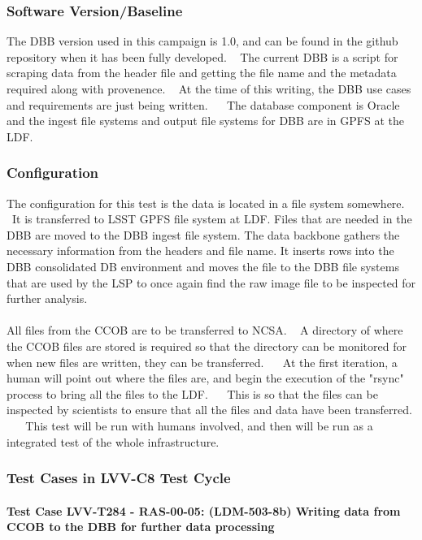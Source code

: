 \documentclass[DM,lsstdraft,STR,toc]{lsstdoc}
\begin{document}
  \subsubsection{Software Version/Baseline}
    The DBB version used in this campaign is 1.0, and can be found in the
github repository when it has been fully developed. ~ The current DBB is
a script for scraping data from the header file and getting the file
name and the metadata required along with provenence. ~ At the time of
this writing, the DBB use cases and requirements are just being written.
~ ~The database component is Oracle and the ingest file systems and
output file systems for DBB are in GPFS at the LDF. ~


  \subsubsection{Configuration}
    The configuration for this test is the data is located in a file system
somewhere. ~It is transferred to LSST GPFS file system at LDF. Files
that are needed in the DBB are moved to the DBB ingest file system. The
data backbone gathers the necessary information from the headers and
file name. It inserts rows into the DBB consolidated DB environment and
moves the file to the DBB file systems that are used by the LSP to once
again find the raw image file to be inspected for further analysis. ~\\
~\\
All files from the CCOB are to be transferred to NCSA. ~ A directory of
where the CCOB files are stored is required so that the directory can be
monitored for when new files are written, they can be transferred. ~ ~At
the first iteration, a human will point out where the files are, and
begin the execution of the "rsync" process to bring all the files to the
LDF. ~ ~This is so that the files can be inspected by scientists to
ensure that all the files and data have been transferred. ~ ~ This test
will be run with humans involved, and then will be run as a integrated
test of the whole infrastructure. ~


  \subsubsection{Test Cases in LVV-C8 Test Cycle}


    \paragraph{Test Case LVV-T284 - RAS-00-05: (LDM-503-8b) Writing data from CCOB to the DBB for further
data processing
 }\mbox{}\\
\end{document}
